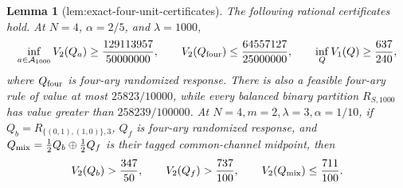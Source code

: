 \documentclass{article}
\newtheorem{lemma}{Lemma}
\begin{document}
\begin{lemma}[lem:exact-four-unit-certificates]\label{lem:exact-four-unit-certificates}
The following rational certificates hold.  At \(N=4\), \(\alpha=2/5\), and \(\lambda=1000\),
\[
 \inf_{a\in\mathcal A_{1000}}V_2(Q_a)\ge\frac{129113957}{50000000},
 \qquad
 V_2(Q_{\rm four})\le\frac{64557127}{25000000},
 \qquad
 \inf_QV_1(Q)\ge\frac{637}{240},
\]
where \(Q_{\rm four}\) is four-ary randomized response.  There is also a feasible four-ary rule of value at most \(25823/10000\), while every balanced binary partition \(R_{S,1000}\) has value greater than \(258239/100000\).  At \(N=4,m=2,\lambda=3,\alpha=1/10\), if \(Q_b=R_{\{(0,1),(1,0)\},3}\), \(Q_f\) is four-ary randomized response, and \(Q_{\rm mix}=\tfrac12Q_b\oplus\tfrac12Q_f\) is their tagged common-channel midpoint, then
\[
 V_2(Q_b)>\frac{347}{50},\qquad
 V_2(Q_f)>\frac{737}{100},\qquad
 V_2(Q_{\rm mix})\le\frac{711}{100}.
\]
\end{lemma}
\end{document}
